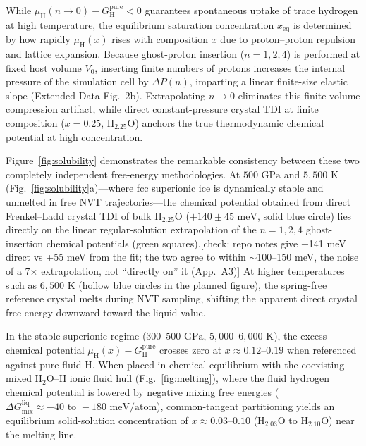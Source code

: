 \documentclass[twocolumn,secnumarabic,amssymb,nobibnotes,aps,prl,superscriptaddress,10pt]{revtex4-2}
\newcommand{\note}[1]{{\color{red}\small[#1]}}
\begin{document}
While $\mu_{\text{H}}(n \to 0) - G_{\text{H}}^{\text{pure}} < 0$ guarantees spontaneous uptake of trace hydrogen at high temperature, the equilibrium saturation concentration $x_{\text{eq}}$ is determined by how rapidly $\mu_{\text{H}}(x)$ rises with composition $x$ due to proton--proton repulsion and lattice expansion. Because ghost-proton insertion ($n = 1, 2, 4$) is performed at fixed host volume $V_0$, inserting finite numbers of protons increases the internal pressure of the simulation cell by $\Delta P(n)$, imparting a linear finite-size elastic slope (Extended Data Fig.~2b). Extrapolating $n \to 0$ eliminates this finite-volume compression artifact, while direct constant-pressure crystal TDI at finite composition ($x = 0.25$, $\text{H}_{2.25}\text{O}$) anchors the true thermodynamic chemical potential at high concentration.

Figure~\ref{fig:solubility} demonstrates the remarkable consistency between these two completely independent free-energy methodologies. At $500\text{ GPa}$ and $5,500\text{ K}$ (Fig.~\ref{fig:solubility}a)---where fcc superionic ice is dynamically stable and unmelted in free NVT trajectories---the chemical potential obtained from direct Frenkel--Ladd crystal TDI of bulk $\text{H}_{2.25}\text{O}$ ($+140 \pm 45\text{ meV}$, solid blue circle) lies directly on the linear regular-solution extrapolation of the $n = 1, 2, 4$ ghost-insertion chemical potentials (green squares).\note{check: repo notes give +141 meV direct vs +55 meV from the fit; the two agree to within $\sim$100--150 meV, the noise of a 7$\times$ extrapolation, not ``directly on'' it (App.~A3)} At higher temperatures such as $6,500\text{ K}$ (hollow blue circles in the planned figure), the spring-free reference crystal melts during NVT sampling, shifting the apparent direct crystal free energy downward toward the liquid value.

In the stable superionic regime ($300\text{--}500\text{ GPa}$, $5,000\text{--}6,000\text{ K}$), the excess chemical potential $\mu_{\text{H}}(x) - G_{\text{H}}^{\text{pure}}$ crosses zero at $x \approx 0.12\text{--}0.19$ when referenced against pure fluid $\text{H}$. When placed in chemical equilibrium with the coexisting mixed $\text{H}_2\text{O}\text{--H}$ ionic fluid hull (Fig.~\ref{fig:melting}), where the fluid hydrogen chemical potential is lowered by negative mixing free energies ($\Delta G_{\text{mix}}^{\text{liq}} \approx -40\text{ to }-180\text{ meV/atom}$), common-tangent partitioning yields an equilibrium solid-solution concentration of $x \approx 0.03\text{--}0.10$ ($\text{H}_{2.03}\text{O}$ to $\text{H}_{2.10}\text{O}$) near the melting line.
\end{document}
